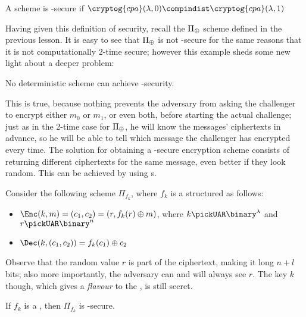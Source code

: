 \begin{definition}
    A scheme is \cpa-secure if $\cryptog{cpa}(\lambda, 0) \compindist \cryptog{cpa}(\lambda, 1)$
\end{definition}


Having given this definition of security, recall the $\Pi_{\oplus}$ scheme defined in the previous lesson. It is easy to see that $\Pi_{\oplus}$ is not \cpa-secure for the same reasons that it is not computationally 2-time secure; however this example sheds some new light about a deeper problem:

\begin{observation}
    No deterministic scheme can achieve \cpa-security.
\end{observation}

This is true, because nothing prevents the adversary from asking the challenger to encrypt either $m_0$ or $m_1$, or even both, before starting the actual challenge; just as in the 2-time case for $\Pi_{\oplus}$, he will know the messages' ciphertexts in advance, so he will be able to tell which message the challenger has encrypted every time. The solution for obtaining a \cpa-secure encryption scheme consists of returning different ciphertexts for the same message, even better if they look random. This can be achieved by using \prf{}s.

Consider the following \ske{} scheme $\Pi_{f_k}$, where $f_k$ is a \prf{} structured as follows:

\begin{itemize}
    \item $\Enc(k, m) = (c_1, c_2) = (r, f_k(r) \xor m)$, where $k \pickUAR \binary^\lambda$ and $r \pickUAR \binary^n$
    
    \item $\Dec(k, (c_1, c_2)) = f_k(c_1) \xor c_2$
\end{itemize}

Observe that the random value $r$ is part of the ciphertext, making it long $n+l$ bits; also more importantly, the adversary can and will always see $r$. The key $k$ though, which gives a \textit{flavour} to the \prf, is still secret.

\begin{theorem} \label{thm:prfcpa}
    If $f_k$ is a \prf, then $\Pi_{f_k}$ is \cpa-secure.
\end{theorem}

